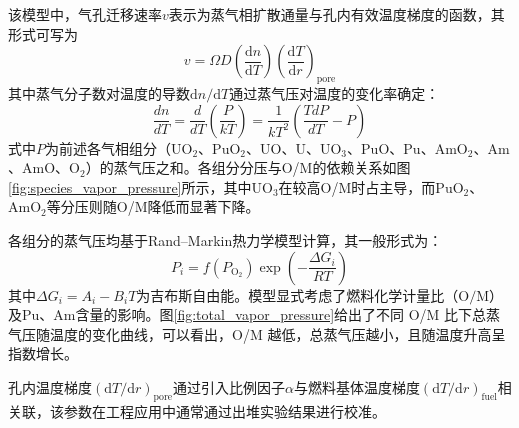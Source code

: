 该模型中，气孔迁移速率$v$表示为蒸气相扩散通量与孔内有效温度梯度的函数，其形式可写为
\begin{equation}
	v = \Omega D \left( \frac{\mathrm{d}n}{\mathrm{d}T} \right)
	\left( \frac{\mathrm{d}T}{\mathrm{d}r} \right)_{\mathrm{pore}}
\end{equation}
其中蒸气分子数对温度的导数$\mathrm{d}n/\mathrm{d}T$通过蒸气压对温度的变化率确定：
\begin{equation}
	\frac{dn}{dT}=\frac{d}{dT}\left( \frac{P}{kT}\right)=\frac{1}{kT^2}\left(\frac{TdP}{dT} - P\right)
\end{equation}
式中$P$为前述各气相组分（$\mathrm{UO}_2$、$\mathrm{PuO}_2$、$\mathrm{UO}$、$\mathrm{U}$、$\mathrm{UO}_3$、$\mathrm{PuO}$、$\mathrm{Pu}$、$\mathrm{AmO}_2$、$\mathrm{Am}$、$\mathrm{AmO}$、$\mathrm{O}_2$）的蒸气压之和。各组分分压与O/M的依赖关系如图\ref{fig:species_vapor_pressure}所示，其中$\mathrm{UO}_3$在较高O/M时占主导，而$\mathrm{PuO}_2$、$\mathrm{AmO}_2$等分压则随O/M降低而显著下降。

各组分的蒸气压均基于Rand--Markin热力学模型计算，其一般形式为：
\begin{equation}
	P_i = f(P_{\mathrm{O}_2}) \exp(-\frac{\Delta G_i}{RT})
\end{equation}
其中$\Delta G_i=A_i-B_iT$为吉布斯自由能。模型显式考虑了燃料化学计量比（$\mathrm{O/M}$）及$\mathrm{Pu}$、$\mathrm{Am}$含量的影响。图\ref{fig:total_vapor_pressure}给出了不同 O/M 比下总蒸气压随温度的变化曲线，可以看出，O/M 越低，总蒸气压越小，且随温度升高呈指数增长。

孔内温度梯度$(\mathrm{d}T/\mathrm{d}r)_{\mathrm{pore}}$通过引入比例因子$\alpha$与燃料基体温度梯度$(\mathrm{d}T/\mathrm{d}r)_{\mathrm{fuel}}$相关联，该参数在工程应用中通常通过出堆实验结果进行校准。

